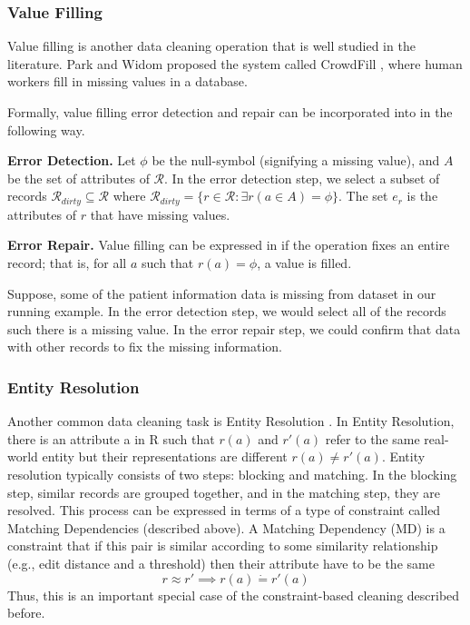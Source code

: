 \subsubsection{Value Filling}
Value filling is another data cleaning operation that is well studied in the literature.
Park and Widom proposed the system called CrowdFill \cite{park2014crowdfill}, where human workers fill in missing values in a database.

Formally, value filling error detection and repair can be incorporated into \sys in the following way.

\vspace{0.5em}

\noindent\textbf{Error Detection. } Let $\phi$ be the null-symbol (signifying a missing value), and $A$ be the set of attributes of $\mathcal{R}$. In the error detection step, we select a subset of records $\mathcal{R}_{dirty} \subseteq \mathcal{R}$ where $\mathcal{R}_{dirty}=\{r \in \mathcal{R}: \exists r(a\in A) = \phi \}$.
The set $e_r$ is the attributes of $r$ that have missing values.

\vspace{0.5em}

\noindent\textbf{Error Repair. } Value filling can be expressed in \sys if the operation fixes an entire record; that is, for all $a$ such that $r(a) = \phi$, a value is filled.

\begin{example}
Suppose, some of the patient information data is missing from dataset in our running example.
In the error detection step, we would select all of the records such there is a missing value.
In the error repair step, we could confirm that data with other records to fix the missing information.
\end{example}

\subsubsection{Entity Resolution}
Another common data cleaning task is Entity Resolution \cite{gokhale2014corleone, DBLP:journals/pvldb/KopckeTR10}.
In Entity Resolution, there is an attribute a in R such that $r(a)$ and $r'(a)$ refer to the same real-world entity but their representations are different $r(a) \ne r'(a)$.
Entity resolution typically consists of two steps: blocking and matching.
In the blocking step, similar records are grouped together, and in the matching step, they are resolved.
This process can be expressed in terms of a type of constraint called Matching Dependencies (described above).
A Matching Dependency (MD) is a constraint that if this pair is similar according to some similarity relationship (e.g., edit distance and a threshold) then their attribute have to be the same
\[ r \approx r' \implies r(a) \dot{=} r'(a) \]
Thus, this is an important special case of the constraint-based cleaning described before.

